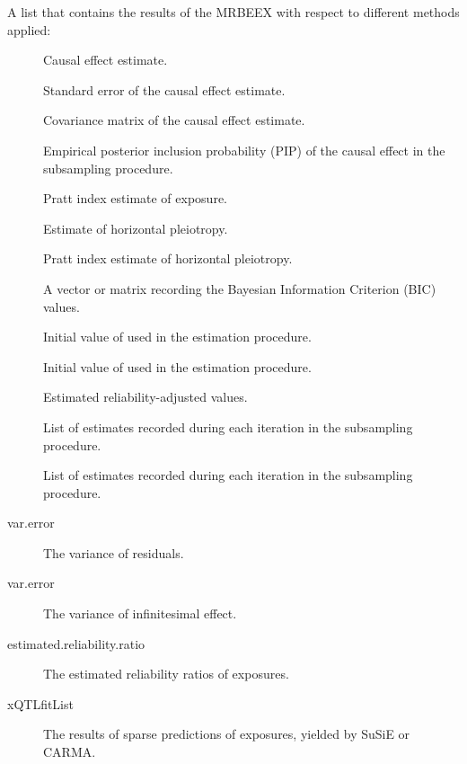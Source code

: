 \documentclass[a4paper]{book}
\begin{document}
%
\begin{Value}
A list that contains the results of the MRBEEX with respect to different methods applied:
\begin{description}

\item[] Causal effect estimate.
\item[] Standard error of the causal effect estimate.
\item[] Covariance matrix of the causal effect estimate.
\item[] Empirical posterior inclusion probability (PIP) of the causal effect in the subsampling procedure.
\item[] Pratt index estimate of exposure.
\item[] Estimate of horizontal pleiotropy.
\item[] Pratt index estimate of horizontal pleiotropy.
\item[] A vector or matrix recording the Bayesian Information Criterion (BIC) values.
\item[] Initial value of  used in the estimation procedure.
\item[] Initial value of  used in the estimation procedure.
\item[] Estimated reliability-adjusted values.
\item[] List of  estimates recorded during each iteration in the subsampling procedure.
\item[] List of  estimates recorded during each iteration in the subsampling procedure.
\item[var.error] The variance of residuals.
\item[var.error] The variance of infinitesimal effect.
\item[estimated.reliability.ratio] The estimated reliability ratios of exposures.
\item[xQTLfitList] The results of sparse predictions of exposures, yielded by SuSiE or CARMA.

\end{description}

\end{Value}
\end{document}
